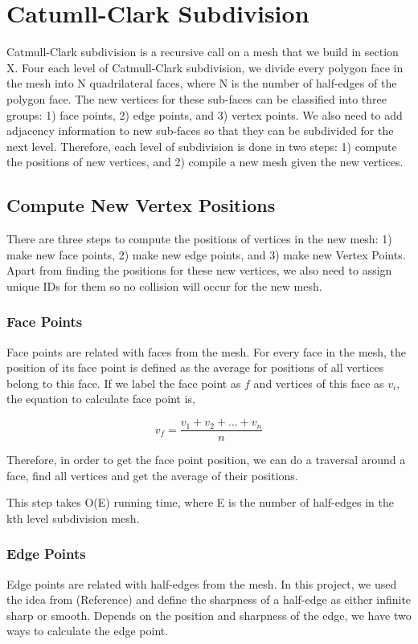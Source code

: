 \documentclass[12pt]{article}
\begin{document}
\newpage

\section{Catumll-Clark Subdivision} \label{sec:ccsd}

Catmull-Clark subdivision is a recursive call on a mesh that we build in section X. Four each level of Catmull-Clark subdivision, we divide every polygon face in the mesh into N quadrilateral faces, where N is the number of half-edges of the polygon face. The new vertices for these sub-faces can be classified into three groups: 1) face points, 2) edge points, and 3) vertex points. We also need to add adjacency information to new sub-faces so that they can be subdivided for the next level. Therefore, each level of subdivision is done in two steps: 1) compute the positions of new vertices, and 2) compile a new mesh given the new vertices.

\subsection{Compute New Vertex Positions}
There are three steps to compute the positions of vertices in the new mesh: 1) make new face points, 2) make new edge points, and 3) make new Vertex Points. Apart from finding the positions for these new vertices, we also need to assign unique IDs for them so no collision will occur for the new mesh.

\subsubsection{Face Points}
Face points are related with faces from the mesh. For every face in the mesh, the position of its face point is defined as the average for positions of all vertices belong to this face. If we label the face point as $f$ and vertices of this face as $v_i$, the equation to calculate face point is,

$$v_f = \frac{v_1 + v_2 + ... + v_n}{n}$$

Therefore, in order to get the face point position, we can do a traversal around a face, find all vertices and get the average of their positions.

This step takes O(E) running time, where E is the number of half-edges in the kth level subdivision mesh.

\subsubsection{Edge Points}
Edge points are related with half-edges from the mesh. In this project, we used the idea from (Reference) and define the sharpness of a half-edge as either infinite sharp or smooth. Depends on the position and sharpness of the edge, we have two ways to calculate the edge point. 
\end{document}
